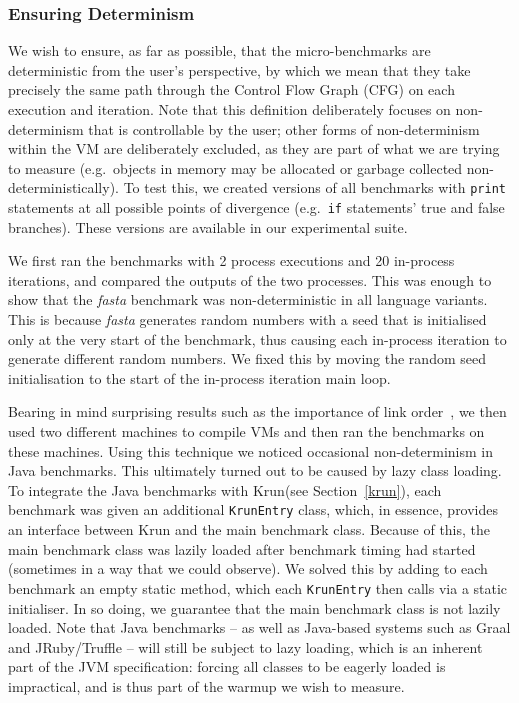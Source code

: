 \documentclass[a4paper,UKenglish]{lipics}
\newcommand{\krun}{Krun\xspace}
\newcommand{\fasta}{\emph{fasta}\xspace}
\begin{document}
\subsubsection{Ensuring Determinism}

We wish to ensure, as far as possible, that the micro-benchmarks are
deterministic from the user's perspective, by which we mean that they
take precisely the same path through the Control Flow Graph (CFG) on each
execution and iteration. Note that this definition deliberately focuses
on non-determinism that is controllable by the user; other forms of
non-determinism within the VM are deliberately excluded, as they are
part of what we are trying to measure (e.g.~objects in memory may be allocated
or garbage collected non-deterministically). To test this, we created
versions of all benchmarks with \texttt{print} statements at all possible points of
divergence (e.g.~\texttt{if} statements' true and false branches).
These versions are available in our experimental suite.

We first ran the benchmarks with 2 process executions and 20 in-process iterations,
and compared the outputs of the two processes. This was enough to show that the
\fasta benchmark was non-deterministic
in all language variants. This is because \fasta generates random numbers with
a seed that is initialised only at the very start of the benchmark, thus
causing each in-process iteration to generate different random numbers. We
fixed this by moving the random seed initialisation to the start
of the in-process iteration main loop.

Bearing in mind surprising
results such as the importance of link order~\cite{mytkowicz09surprising}, we
then used two different machines to compile VMs and then ran the benchmarks
on these machines.
Using this technique we noticed occasional non-determinism in Java benchmarks.
This ultimately turned out to be caused by lazy class loading. To integrate
the Java benchmarks with \krun (see Section~\ref{krun}), each
benchmark was given an additional \texttt{KrunEntry} class,
which, in essence, provides an interface between \krun and the main benchmark
class. Because of this, the main benchmark class was lazily loaded after
benchmark timing had started (sometimes in a way that we could observe). We
solved this by adding to each benchmark an empty static method, which each
\texttt{KrunEntry} then calls via a static initialiser. In so doing, we
guarantee that the main benchmark class is not lazily loaded. Note that Java
benchmarks -- as well as
Java-based systems such as Graal and JRuby/Truffle -- will still be subject to
lazy loading, which is an inherent part of the JVM specification: forcing all
classes to be eagerly loaded is impractical, and is thus part of the warmup we
wish to measure.
\end{document}
